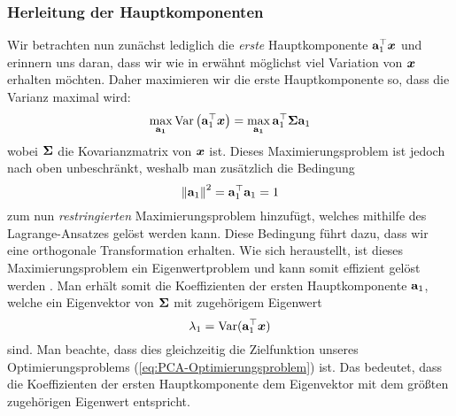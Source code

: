\subsubsection{Herleitung der Hauptkomponenten}
\label{ch:MethodenDerDimRed:traditionell:PCA:HerleitungPC}
Wir betrachten nun zunächst lediglich die \textit{erste} Hauptkomponente $\mathbf{a}_1^\top \bm{x}$ und erinnern uns daran, dass wir wie in  erwähnt möglichst viel Variation von $\bm{x}$ erhalten möchten. Daher maximieren wir die erste Hauptkomponente so, dass die Varianz maximal wird:
\begin{equation}
	\label{eq:PCA-Optimierungsproblem}
	\max_{\mathbf{a_1}} \operatorname{Var} \left( \mathbf{a}_1^\top \bm{x} \right) = \max_{\mathbf{a_1}} \mathbf{a}_1^\top \mathbf{\Sigma} \mathbf{a}_1
\end{equation}
wobei $\mathbf{\Sigma}$ die Kovarianzmatrix von $\bm{x}$ ist. Dieses Maximierungsproblem ist jedoch nach oben unbeschränkt, weshalb man zusätzlich die Bedingung
\begin{equation}
	\left\lVert \mathbf{a}_1 \right\rVert^2 = \mathbf{a}_1^\top \mathbf{a}_1 = 1
\end{equation}
zum nun \textit{restringierten} Maximierungsproblem hinzufügt, welches mithilfe des Lagrange-Ansatzes gelöst werden kann. Diese Bedingung führt dazu, dass wir eine orthogonale Transformation erhalten. Wie sich heraustellt, ist dieses Maximierungsproblem ein Eigenwertproblem und kann somit effizient gelöst werden \parencite[vgl.][4 -- 6]{Jolliffe.2002}.
Man erhält somit die Koeffizienten der ersten Hauptkomponente $\mathbf{a}_1$, welche ein Eigenvektor von $\mathbf{\Sigma}$ mit zugehörigem Eigenwert
\begin{equation}
	\lambda_1 = \operatorname{Var}(\mathbf{a}_1^\top \bm{x})
\end{equation}
sind. Man beachte, dass dies gleichzeitig die Zielfunktion unseres Optimierungsproblems (\eqref{eq:PCA-Optimierungsproblem}) ist. Das bedeutet, dass die Koeffizienten der ersten Hauptkomponente dem Eigenvektor mit dem größten zugehörigen Eigenwert entspricht.


